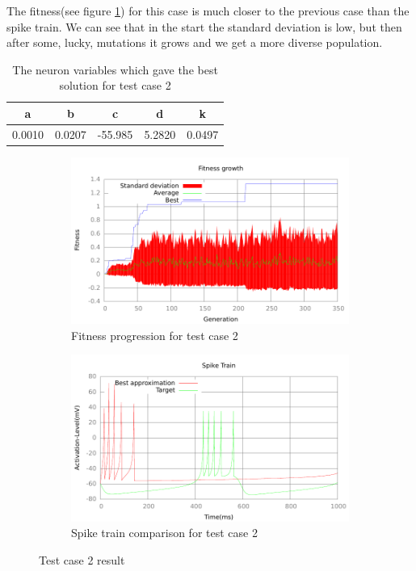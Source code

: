 The fitness(see figure \ref{fig:fitness-test-case-2}) for this case is much 
closer to the previous case than the spike
train. We can see that in the start the standard deviation is low, but then
after some, lucky, mutations it grows and we get a more diverse population.
\begin{table}
	\begin{tabular}{c c c c c}
		a & b & c & d & k \\
		\hline
		0.0010 & 0.0207 & -55.985 & 5.2820 & 0.0497
	\end{tabular}
	\caption{The neuron variables which gave the best solution for test case
	2}
\end{table}
\begin{figure}[h]
	\centering
	\begin{subfigure}[b]{0.5\textwidth}
		\includegraphics[width=\textwidth]{../output/sidm_izzy_1_fitness.pdf}
		\caption{Fitness progression for test case 2}
		\label{fig:fitness-test-case-2}
	\end{subfigure}%
	\begin{subfigure}[b]{0.5\textwidth}
		\includegraphics[width=\textwidth]{../output/sidm_izzy_1_spike.pdf}
		\caption{Spike train comparison for test case 2}
		\label{fig:spike-test-case-2}
	\end{subfigure}
	\caption{Test case 2 result}
\end{figure}

